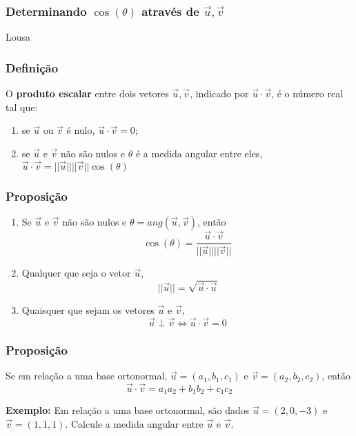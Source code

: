 \documentclass[hyperref={pdfpagelabels=false}]{beamer}
\begin{document}
\begin{frame}
	\frametitle{Determinando $\cos(\theta)$ através de $\overrightarrow{u},\overrightarrow{v}$}
	Lousa
\end{frame}

\begin{frame}
	\frametitle{Definição}
	
	O {\bf produto escalar} entre dois vetores $\overrightarrow{u},\overrightarrow{v}$, indicado por $\overrightarrow{u}\cdot\overrightarrow{v}$, é o número real tal que:
	\begin{enumerate}
		\item se $\overrightarrow{u}$ ou $\overrightarrow{v}$ é nulo, $\overrightarrow{u}\cdot\overrightarrow{v} = 0$;
		\item se $\overrightarrow{u}$ e $\overrightarrow{v}$ não são nulos e $\theta$ é a medida angular entre eles, $\overrightarrow{u}\cdot\overrightarrow{v} = ||\overrightarrow{u}||||\overrightarrow{v}||\cos(\theta)$
	\end{enumerate}
\end{frame}
	
\begin{frame}
	\frametitle{Proposição}
	\begin{enumerate}
		\item Se $\overrightarrow{u}$ e $\overrightarrow{v}$ não são nulos e $\theta = ang(\overrightarrow{u},\overrightarrow{v})$, então
		$$\cos(\theta) = \frac{\overrightarrow{u}\cdot\overrightarrow{v}}{||\overrightarrow{u}||||\overrightarrow{v}||}$$
		\item Qualquer que seja o vetor $\overrightarrow{u}$, 
		$$||\overrightarrow{u}|| = \sqrt{\overrightarrow{u}\cdot\overrightarrow{u}}$$
		\item Quaisquer que sejam os vetores $\overrightarrow{u}$ e $\overrightarrow{v}$,
		$$\overrightarrow{u}\perp\overrightarrow{v} \Leftrightarrow \overrightarrow{u}\cdot\overrightarrow{v} = 0$$
	\end{enumerate}
\end{frame}

\begin{frame}
	\frametitle{Proposição}
	Se em relação a uma base ortonormal, $\overrightarrow{u} = (a_1,b_1,c_1)$ e $\overrightarrow{v} = (a_2,b_2,c_2)$, então
	$$\overrightarrow{u}\cdot\overrightarrow{v} = a_1a_2 + b_1b_2 + c_1c_2$$
	
	\pause
	
	{\bf Exemplo:} Em relação a uma base ortonormal, são dados $\overrightarrow{u} = (2,0,-3)$ e $\overrightarrow{v} = (1,1,1)$. Calcule a medida angular entre $\overrightarrow{u}$ e $\overrightarrow{v}$.
\end{frame}
\end{document}
